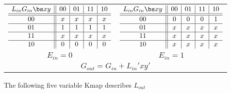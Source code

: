 \begin{enumerate}
\begin{onlysolution}
{                    \begin{tabular}{cc}
                        $
                        \begin{array} {c||c|c|c|c}
                            L_{in} G_{in}  \bs x  y & 00 & 01 & 11 & 10 \\ \hline \hline
                            00       & x  & x  & x  & x  \\ \hline
                            01       & 1  & 1  & 1  & 1  \\ \hline
                            11       & x  & x  & x  & x  \\ \hline
                            10       & 0  & 0  & 0  & 0  \\
                        \end{array}$
                        &
                        $
                        \begin{array} {c||c|c|c|c}
                            L_{in} G_{in}  \bs x  y & 00 & 01 & 11 & 10 \\ \hline \hline
                            00       & 0  & 0  & 0  & 1  \\ \hline
                            01       & x  & x  & x  & x  \\ \hline
                            11       & x  & x  & x  & x  \\ \hline
                            10       & x  & x  & x  & x  \\
                        \end{array}$  \\
                        $E_{in}=0$ & $E_{in}=1$ \\
                        \multicolumn{2}{c}{$G_{out} = G_{in} + L_{in}'xy'$} \\
                    \end{tabular}

                    The following five variable Kmap describes $L_{out}$

}
\end{onlysolution}
\end{enumerate}
